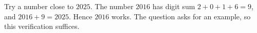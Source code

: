 Try a number close to $2025$. The number $2016$ has digit sum $2+0+1+6=9$, and $2016+9=2025$. Hence $\boxed{2016}$ works. The question asks for an example, so this verification suffices.

